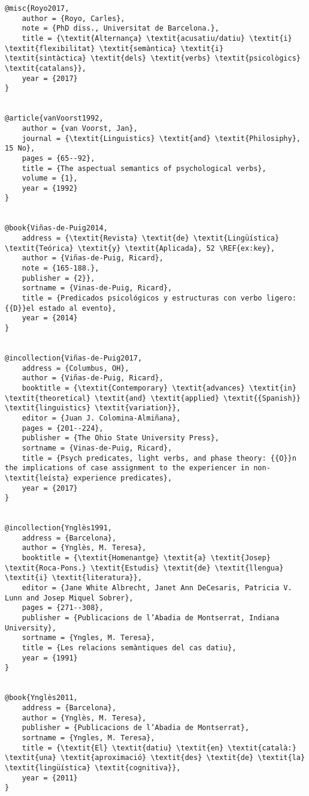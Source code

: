 \documentclass[output=paper,modfonts,nonflat]{langsci/langscibook}
\begin{document}
\begin{verbatim}
@misc{Royo2017,
	author = {Royo, Carles},
	note = {PhD diss., Universitat de Barcelona.},
	title = {\textit{Alternança} \textit{acusatiu/datiu} \textit{i} \textit{flexibilitat} \textit{semàntica} \textit{i} \textit{sintàctica} \textit{dels} \textit{verbs} \textit{psicològics} \textit{catalans}},
	year = {2017}
}


@article{vanVoorst1992,
	author = {van Voorst, Jan},
	journal = {\textit{Linguistics} \textit{and} \textit{Philosiphy}, 15 No},
	pages = {65--92},
	title = {The aspectual semantics of psychological verbs},
	volume = {1},
	year = {1992}
}


@book{Viñas-de-Puig2014,
	address = {\textit{Revista} \textit{de} \textit{Lingüística} \textit{Teórica} \textit{y} \textit{Aplicada}, 52 \REF{ex:key},
	author = {Viñas-de-Puig, Ricard},
	note = {165-188.},
	publisher = {2}},
	sortname = {Vinas-de-Puig, Ricard},
	title = {Predicados psicológicos y estructuras con verbo ligero: {{D}}el estado al evento},
	year = {2014}
}


@incollection{Viñas-de-Puig2017,
	address = {Columbus, OH},
	author = {Viñas-de-Puig, Ricard},
	booktitle = {\textit{Contemporary} \textit{advances} \textit{in} \textit{theoretical} \textit{and} \textit{applied} \textit{{Spanish}} \textit{linguistics} \textit{variation}},
	editor = {Juan J. Colomina-Almiñana},
	pages = {201--224},
	publisher = {The Ohio State University Press},
	sortname = {Vinas-de-Puig, Ricard},
	title = {Psych predicates, light verbs, and phase theory: {{O}}n the implications of case assignment to the experiencer in non-\textit{leísta} experience predicates},
	year = {2017}
}


@incollection{Ynglès1991,
	address = {Barcelona},
	author = {Ynglès, M. Teresa},
	booktitle = {\textit{Homenantge} \textit{a} \textit{Josep} \textit{Roca-Pons.} \textit{Estudis} \textit{de} \textit{llengua} \textit{i} \textit{literatura}},
	editor = {Jane White Albrecht, Janet Ann DeCesaris, Patricia V. Lunn and Josep Miquel Sobrer},
	pages = {271--308},
	publisher = {Publicacions de l’Abadia de Montserrat, Indiana University},
	sortname = {Yngles, M. Teresa},
	title = {Les relacions semàntiques del cas datiu},
	year = {1991}
}


@book{Ynglès2011,
	address = {Barcelona},
	author = {Ynglès, M. Teresa},
	publisher = {Publicacions de l’Abadia de Montserrat},
	sortname = {Yngles, M. Teresa},
	title = {\textit{El} \textit{datiu} \textit{en} \textit{català:} \textit{una} \textit{aproximació} \textit{des} \textit{de} \textit{la} \textit{lingüística} \textit{cognitiva}},
	year = {2011}
}


\end{verbatim}
\sloppy\printbibliography[heading=subbibliography,notkeyword=this]
\end{document}
